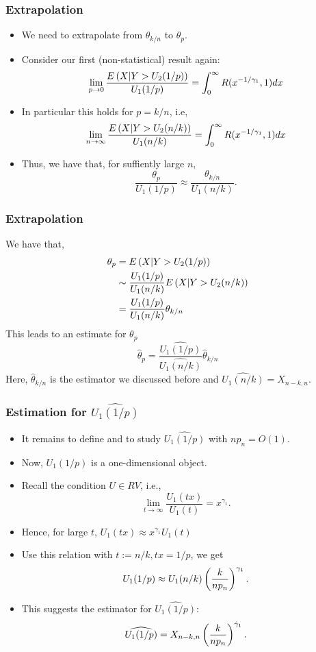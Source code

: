 \documentclass{beamer}
\begin{document}
\begin{frame}
    \frametitle{Extrapolation}
\begin{itemize}
    \item We need to extrapolate from $\theta_{k/n}$ to $\theta_p$.
    \item Consider our first (non-statistical) result again:
    $$
\lim_{p\to 0}\frac{E\left(X|Y>U_2(1/p)\right)}{U_1(1/p)} = \int_0^{\infty} R(x^{-1/\gamma_1},1)dx
    $$
\item In particular this holds for $p=k/n$, i.e,
$$
\lim_{n\to \infty}\frac{E\left(X|Y>U_2(n/k)\right)}{U_1(n/k)} = \int_0^{\infty} R(x^{-1/\gamma_1},1)dx
$$
\item Thus, we have that, for suffiently large $n$,
$$
\frac{\theta_p}{U_1(1/p)} \approx \frac{\theta_{k/n}}{U_1(n/k)}.
$$
\end{itemize}
\end{frame}


\begin{frame}
    \frametitle{Extrapolation}
We have that,
$$
\begin{aligned}
    \theta_p & = E\left(X|Y>U_2(1/p)\right) \\
    &\sim \frac{U_1(1/p)}{U_1(n/k)} E\left(X|Y>U_2(n/k)\right)\\
    &=\frac{U_1(1/p)}{U_1(n/k)}\theta_{k/n}
\end{aligned}
$$
 This leads to an estimate for $\theta_p$
 $$
 \hat{\theta}_p =\frac{\widehat{U_1(1/p)}}{\widehat{U_1(n/k)}}\hat{\theta}_{k/n}
 $$
Here, $\hat{\theta}_{k/n}$ is the estimator we discussed before and $\widehat{U_1(n/k)}=X_{n-k,n}$.
\end{frame}


\begin{frame}
    \frametitle{Estimation for $\widehat{U_1(1/p)}$ }
    \begin{itemize}
        \item It remains to define and
        to study $\widehat{U_1(1/p)}$ with $np_n=O(1)$.
        \item Now, $U_1(1/p)$ is a one-dimensional object.
        \item Recall the condition $ U\in RV$, i.e., 
        $$
            \lim_{t\to \infty} \frac{U_1(tx)}{U_1(t)} =x^{\gamma_1}.
        $$
        \item Hence, for large $t$, $U_1(tx)\approx x^{\gamma_1} U_1(t)$
        \item Use this relation with $t:=n/k, tx=1/p$, we get 
        $$
            U_1(1/p)\approx U_1(n/k)\left(\frac{k}{np_n}\right)^{\gamma_1}.
        $$
        \item This suggests the estimator for $\widehat{U_1(1/p)}$:
        $$
        \widehat{U_1(1/p)}=X_{n-k,n}\left(\frac{k}{np_n}\right)^{\hat{\gamma}_1}.
        $$
    \end{itemize}
    
    

\end{frame}
\end{document}
